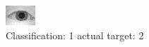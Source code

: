 \begin{figure}[h!]
\begin{center}
\includegraphics[width=0.60\columnwidth]{figures/ID1014_class_1_target_2.png}
\end{center}
\caption{ Classification: 1 actual target: 2}
\label{fig:ID1014_class_1_target_2}
\end{figure}
